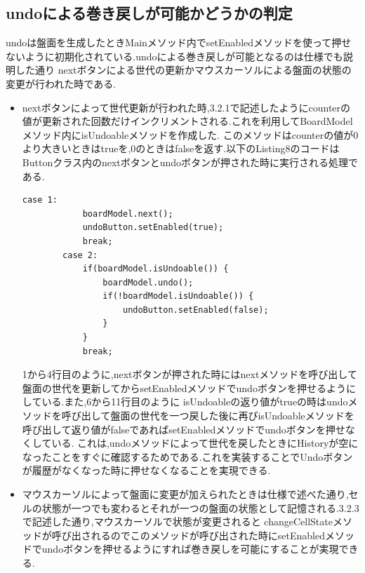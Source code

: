 \documentclass[dvipdfmx]{jarticle}
\begin{document}
\subsection{undoによる巻き戻しが可能かどうかの判定}
undoは盤面を生成したときMainメソッド内でsetEnabledメソッドを使って押せないように初期化されている.undoによる巻き戻しが可能となるのは仕様でも説明した通り
nextボタンによる世代の更新かマウスカーソルによる盤面の状態の変更が行われた時である.
\begin{itemize}
    \item nextボタンによって世代更新が行われた時,3.2.1で記述したようにcounterの値が更新された回数だけインクリメントされる.これを利用してBoardModelメソッド内にisUndoableメソッドを作成した.
    このメソッドはcounterの値が0より大きいときはtrueを,0のときはfalseを返す.以下のListing8のコードはButtonクラス内のnextボタンとundoボタンが押された時に実行される処理である.
    \begin{lstlisting}[caption=nextボタン及びundoボタンを押したときに実行される処理,label=fuga]
        case 1:
            boardModel.next();
            undoButton.setEnabled(true);
            break;
        case 2:
            if(boardModel.isUndoable()) {
                boardModel.undo();
                if(!boardModel.isUndoable()) {
                    undoButton.setEnabled(false);
                }
            }
            break;
    \end{lstlisting}
    1から4行目のように,nextボタンが押された時にはnextメソッドを呼び出して盤面の世代を更新してからsetEnabledメソッドでundoボタンを押せるようにしている.また,6から11行目のように
    isUndoableの返り値がtrueの時はundoメソッドを呼び出して盤面の世代を一つ戻した後に再びisUndoableメソッドを呼び出して返り値がfalseであればsetEnabledメソッドでundoボタンを押せなくしている.
    これは,undoメソッドによって世代を戻したときにHistoryが空になったことをすぐに確認するためである.これを実装することでUndoボタンが履歴がなくなった時に押せなくなることを実現できる.
    \item マウスカーソルによって盤面に変更が加えられたときは仕様で述べた通り,セルの状態が一つでも変わるとそれが一つの盤面の状態として記憶される.3.2.3で記述した通り,マウスカーソルで状態が変更されると
    changeCellStateメソッドが呼び出されるのでこのメソッドが呼び出された時にsetEnabledメソッドでundoボタンを押せるようにすれば巻き戻しを可能にすることが実現できる.
\end{itemize}
\end{document}
